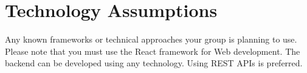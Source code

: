 \section{Technology Assumptions}
Any known frameworks or technical approaches your group
is planning to use. Please note that you must use the React framework for Web development. The backend can be developed using any technology. Using REST APIs is
preferred.
